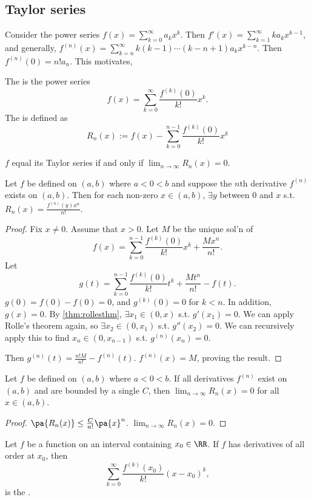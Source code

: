 \documentclass[11pt]{scrartcl}
\numberwithin{equation}{section}
\begin{document}
\subsection{Taylor series}
Consider the power series $f(x)=\sum_{k=0}^{\infty}a_kx^k$.
Then $f'(x) = \sum_{k=1}^{\infty}ka_kx^{k-1}$, and generally,
$f^{(n)}(x) = \sum_{k=n}^{\infty}k(k-1)\cdots(k-n+1)a_kx^{k-n}$.
Then $f^{(n)}(0) = n!a_n$. This motivates,
\begin{definition}
    The  is the power series 
    \[
        f(x) = \sum_{k=0}^{\infty}\frac{f^{(k)}(0)}{k!}x^k.
    \]
    The  is defined as 
    \[
        R_n(x) := f(x) - \sum_{k=0}^{n-1}\frac{f^{(k)}(0)}{k!}x^k
    \]
\end{definition}
$f$ equal its Taylor series if and only if 
$\lim_{n\rightarrow \infty}R_n(x) = 0$.
\begin{theorem}
    \label{thm:taylorthm}
    Let $f$ be defined on $(a,b)$ where $a<0<b$ and suppose 
    the $n$th derivative $f^{(n)}$ exists on $(a,b)$.
    Then for each non-zero $x\in (a,b)$, $\exists y$ between $0$ and $x$ 
    s.t. $R_n(x)=\frac{f^{(n)}(y)x^n}{n!}$.
\end{theorem}
\begin{proof}
    Fix $x\neq 0$. Assume that $x>0$. Let $M$ be the unique sol'n of 
    \[
        f(x) = \sum_{k=0}^{n-1}\frac{f^{(k)}(0)}{k!}x^k + \frac{Mx^n}{n!}.
    \]
    Let 
    \[
        g(t) = \sum_{k=0}^{n-1}\frac{f^{(k)}(0)}{k!}t^k + \frac{Mt^n}{n!}-f(t).
    \]
    $g(0)=f(0)-f(0)=0$, and $g^{(k)}(0)=0$ for $k<n$. In addition, $g(x)=0$.
    By \cref{thm:rollesthm}, $\exists x_1\in(0,x)$ s.t. $g'(x_1)=0$.
    We can apply Rolle's theorem again, so $\exists x_2\in(0,x_1)$ s.t.
    $g''(x_2)=0$. We can recursively apply this to find 
    $x_n\in (0,x_{n-1})$ s.t. $g^{(n)}(x_n)=0$.

    Then $g^{(n)}(t) = \frac{n!M}{n!}-f^{(n)}(t)$.
    $f^{(n)}(x) = M$, proving the result.
\end{proof}
\begin{corollary}
    Let $f$ be defined on $(a,b)$ where $a<0<b$. If all derivatives 
    $f^{(n)}$ exist on $(a,b)$ and are bounded by a single $C$,
    then $\lim_{n\rightarrow \infty}R_n(x) = 0$ for all $x\in(a,b)$.
\end{corollary}
\begin{proof}
    $\pa{R_n(x)}\leq \frac{C}{n!}\pa{x}^n$. $\lim_{n\rightarrow \infty}R_n(x)=0$.
\end{proof}
\begin{definition}
    Let $f$ be a function on an interval containing $x_0\in\RR$. If $f$ 
    has derivatives of all order at $x_0$, then 
    \[
        \sum_{k=0}^{\infty}\frac{f^{(k)}(x_0)}{k!}(x-x_0)^k,
    \]
    is the .
\end{definition}
\end{document}
